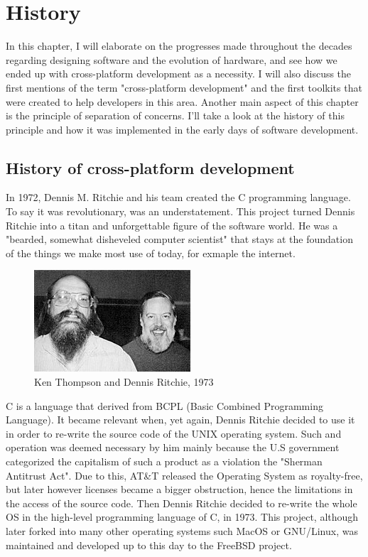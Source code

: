 \chapter{History}
\label{chap:ch1}

\indent

\par
In this chapter, I will elaborate on the progresses made throughout the decades regarding designing software and the evolution of hardware, 
and see how we ended up with cross-platform development as a necessity.
I will also discuss the first mentions of the term "cross-platform development" and the first toolkits that were created to help developers in this area.
Another main aspect of this chapter is the principle of separation of concerns.
I'll take a look at the history of this principle and how it was implemented in the early days of software development.

\section{History of cross-platform development}
In 1972, Dennis M.
Ritchie and his team created the C programming language.
To say it was revolutionary, was an understatement.
This project turned Dennis Ritchie into a titan and unforgettable figure of the software world.
He was a "bearded, somewhat disheveled computer scientist"\cite{ritchieJobs} that stays at the foundation of the things we make most use of today, for exmaple the internet.
\begin{figure}[htbp]
    \centering
    \includegraphics[scale=0.7]{pictures/KenThompson_and_DennisRitchie1973.jpg}
    \caption{Ken Thompson and Dennis Ritchie, 1973}
    \label{unixMakers}
\end{figure}

\par
C is a language that derived from BCPL (Basic Combined Programming Language).
It became relevant when, yet again, Dennis Ritchie decided to use it in order to re-write the source code of the UNIX operating system.
Such and operation was deemed necessary by him mainly because the U.S government categorized the capitalism of such a product as a violation the "Sherman Antitrust Act"\cite{unixRepo}.
Due to this, AT\&T released the Operating System as royalty-free, but later however licenses became a bigger obstruction, hence the limitations in the access of the source code.
Then Dennis Ritchie decided to re-write the whole OS in the high-level programming language of C, in 1973.
This project, although later forked into many other operating systems such MacOS or GNU/Linux, was maintained and developed up to this day to the FreeBSD project.

